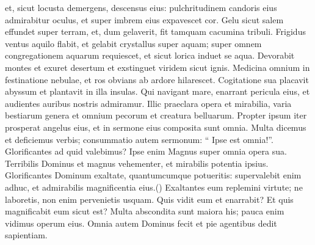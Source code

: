 \begin{biblechapter}
\begin{biblechapter}
\begin{biblechapter}
\begin{biblechapter}
\begin{biblechapter}
\begin{biblechapter}
\begin{biblechapter}
\begin{biblechapter}
\begin{biblechapter}
\begin{biblechapter}
\begin{biblechapter}
\begin{biblechapter}
\begin{biblechapter}
\begin{biblechapter}
\begin{biblechapter}
\begin{biblechapter}
\begin{biblechapter}
\begin{biblechapter}
\begin{biblechapter}
\begin{biblechapter}
\begin{biblechapter}
\begin{biblechapter}
\begin{biblechapter}
\begin{biblechapter}
\begin{biblechapter}
\begin{biblechapter}
\begin{biblechapter}
\begin{biblechapter}
\begin{biblechapter}
\begin{biblechapter}
\begin{biblechapter}
\begin{biblechapter}
\begin{biblechapter}
\begin{biblechapter}
\begin{biblechapter}
\begin{biblechapter}
\begin{biblechapter}
\begin{biblechapter}
\begin{biblechapter}
\begin{biblechapter}
\begin{biblechapter}
\begin{biblechapter}
\begin{biblechapter}
 et, sicut locusta demergens, descensus eius:
 \verse pulchritudinem candoris eius admirabitur oculus,
 et super imbrem eius expavescet cor.
 \verse Gelu sicut salem effundet super terram,
 et, dum gelaverit, fit tamquam cacumina tribuli.
 \verse Frigidus ventus aquilo flabit,
 et gelabit crystallus super aquam;
 super omnem congregationem aquarum requiescet,
 et sicut lorica induet se aqua.
 \verse Devorabit montes et exuret desertum
 et exstinguet viridem sicut ignis.
 \verse Medicina omnium in festinatione nebulae,
 et ros obvians ab ardore hilarescet.
 \verse Cogitatione sua placavit abyssum
 et plantavit in illa insulas.
 \verse Qui navigant mare, enarrant pericula eius,
 et audientes auribus nostris admiramur.
 \verse Illic praeclara opera et mirabilia,
 varia bestiarum genera et omnium pecorum et creatura belluarum.
 \verse Propter ipsum iter prosperat angelus eius,
 et in sermone eius composita sunt omnia.
 \verse Multa dicemus et deficiemus verbis; consummatio autem sermonum: “ Ipse est omnia!”.
 \verse Glorificantes ad quid valebimus?
 Ipse enim Magnus super omnia opera sua.
 \verse Terribilis Dominus et magnus vehementer,
 et mirabilis potentia ipsius.
 \verse Glorificantes Dominum exaltate, quantumcumque potueritis:
 supervalebit enim adhuc,
 et admirabilis magnificentia eius.(\verse)
 \verse Exaltantes eum replemini virtute;
 ne laboretis, non enim pervenietis usquam.
 \verse Quis vidit eum et enarrabit?
 Et quis magnificabit eum sicut est?
 \verse Multa abscondita sunt maiora his;
 pauca enim vidimus operum eius.
 \verse Omnia autem Dominus fecit
 et pie agentibus dedit sapientiam.
 

\end{biblechapter}
\end{biblechapter}
\end{biblechapter}
\end{biblechapter}
\end{biblechapter}
\end{biblechapter}
\end{biblechapter}
\end{biblechapter}
\end{biblechapter}
\end{biblechapter}
\end{biblechapter}
\end{biblechapter}
\end{biblechapter}
\end{biblechapter}
\end{biblechapter}
\end{biblechapter}
\end{biblechapter}
\end{biblechapter}
\end{biblechapter}
\end{biblechapter}
\end{biblechapter}
\end{biblechapter}
\end{biblechapter}
\end{biblechapter}
\end{biblechapter}
\end{biblechapter}
\end{biblechapter}
\end{biblechapter}
\end{biblechapter}
\end{biblechapter}
\end{biblechapter}
\end{biblechapter}
\end{biblechapter}
\end{biblechapter}
\end{biblechapter}
\end{biblechapter}
\end{biblechapter}
\end{biblechapter}
\end{biblechapter}
\end{biblechapter}
\end{biblechapter}
\end{biblechapter}
\end{biblechapter}
